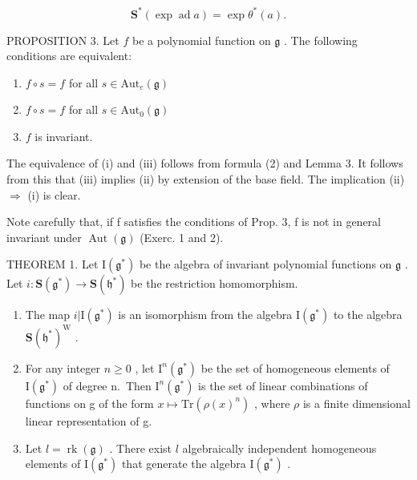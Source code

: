 \[
\mathbf {S} ^ {*} (\exp \operatorname{ad} a) = \exp \theta^ {*} (a).\tag{2}
\]

PROPOSITION 3. Let \(f\) be a polynomial function on \(\mathfrak{g}\) . The following conditions are equivalent:

\begin{enumerate}
\def\labelenumi{(\roman{enumi})}
\item
  \(f\circ s = f\) for all \(s\in \mathrm{Aut}_e(\mathfrak{g})\)
\item
  \(f\circ s = f\) for all \(s\in \mathrm{Aut}_0(\mathfrak{g})\)
\item
  \(f\) is invariant.
\end{enumerate}

The equivalence of (i) and (iii) follows from formula (2) and Lemma 3. It follows from this that (iii) implies (ii) by extension of the base field. The implication (ii) \(\Longrightarrow\) (i) is clear.

Note carefully that, if f satisfies the conditions of Prop. 3, f is not in general invariant under \(\operatorname{Aut}(\mathfrak{g})\) (Exerc. 1 and 2).

THEOREM 1. Let \(\mathrm{I}(\mathfrak{g}^*)\) be the algebra of invariant polynomial functions on \(\mathfrak{g}\) . Let \(i: \mathbf{S}(\mathfrak{g}^*) \to \mathbf{S}(\mathfrak{h}^*)\) be the restriction homomorphism.

\begin{enumerate}
\def\labelenumi{(\roman{enumi})}
\item
  The map \(i|\mathrm{I}(\mathfrak{g}^*)\) is an isomorphism from the algebra \(\mathrm{I}(\mathfrak{g}^*)\) to the algebra \(\mathbf{S}(\mathfrak{h}^*)^{\mathrm{W}}\) .
\item
  For any integer \(n \geq 0\) , let \(\mathrm{I}^{n}(\mathfrak{g}^{*})\) be the set of homogeneous elements of \(\mathrm{I}(\mathfrak{g}^{*})\) of degree n.~Then \(\mathrm{I}^{n}(\mathfrak{g}^{*})\) is the set of linear combinations of functions on g of the form \(x \mapsto \mathrm{Tr}(\rho(x)^{n})\) , where \(\rho\) is a finite dimensional linear representation of g.
\item
  Let \(l = \operatorname{rk}(\mathfrak{g})\) . There exist \(l\) algebraically independent homogeneous elements of \(\mathrm{I}(\mathfrak{g}^*)\) that generate the algebra \(\mathrm{I}(\mathfrak{g}^*)\) .
\end{enumerate}

